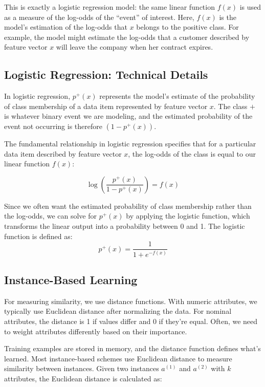     This is exactly a logistic regression model: the same linear function $f(x)$ is used as a measure of the log-odds of the ``event'' of interest. Here, $f(x)$ is the model's estimation of the log-odds that $x$ belongs to the positive class. For example, the model might estimate the log-odds that a customer described by feature vector $x$ will leave the company when her contract expires.


\subsection{Logistic Regression: Technical Details}
    In logistic regression, $p^+(x)$ represents the model's estimate of the probability of class membership of a data item represented by feature vector $x$. The class $+$ is whatever binary event we are modeling, and the estimated probability of the event not occurring is therefore $(1 - p^+(x))$.
    
    The fundamental relationship in logistic regression specifies that for a particular data item described by feature vector $x$, the log-odds of the class is equal to our linear function $f(x)$:
    
    \begin{equation}
        \log\left(\frac{p^+(x)}{1 - p^+(x)}\right) = f(x)
    \end{equation}
    
    Since we often want the estimated probability of class membership rather than the log-odds, we can solve for $p^+(x)$ by applying the logistic function, which transforms the linear output into a probability between 0 and 1.
    The logistic function is defined as:
    \begin{equation}
        p^+(x) = \frac{1}{1 + e^{-f(x)}}
    \end{equation}

\subsection{Instance-Based Learning}
For measuring similarity, we use distance functions. With numeric attributes, we typically use Euclidean distance after normalizing the data. For nominal attributes, the distance is 1 if values differ and 0 if they're equal. Often, we need to weight attributes differently based on their importance.

    Training examples are stored in memory, and the distance function defines what's learned. Most instance-based schemes use Euclidean distance to measure similarity between instances. Given two instances $a^{(1)}$ and $a^{(2)}$ with $k$ attributes, the Euclidean distance is calculated as:

